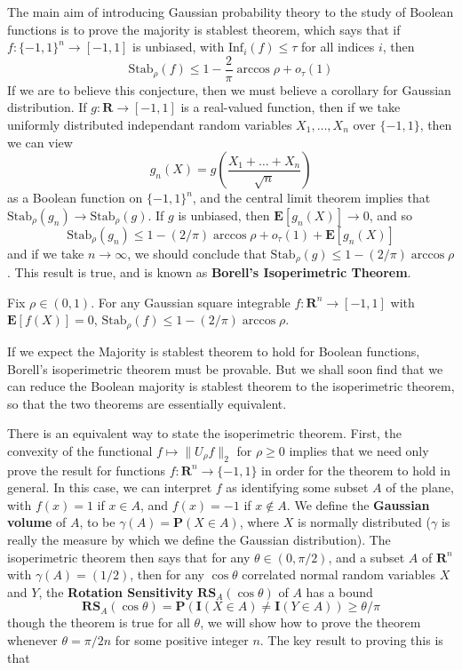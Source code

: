 The main aim of introducing Gaussian probability theory to the study of Boolean functions is to prove the majority is stablest theorem, which says that if $f: \{ -1, 1 \}^n \to [-1,1]$ is unbiased, with $\text{Inf}_i(f) \leq \tau$ for all indices $i$, then
%
\[ \text{Stab}_\rho(f) \leq 1 - \frac{2}{\pi} \arccos \rho + o_\tau(1) \]
%
If we are to believe this conjecture, then we must believe a corollary for Gaussian distribution. If $g: \mathbf{R} \to [-1,1]$ is a real-valued function, then if we take uniformly distributed independant random variables $X_1, \dots, X_n$ over $\{ -1, 1 \}$, then we can view
%
\[ g_n(X) = g \left( \frac{X_1 + \dots + X_n}{\sqrt{n}} \right) \]
%
as a Boolean function on $\{ -1, 1 \}^n$, and the central limit theorem implies that $\text{Stab}_\rho(g_n) \to \text{Stab}_\rho(g)$. If $g$ is unbiased, then $\mathbf{E}[g_n(X)] \to 0$, and so
%
\[ \text{Stab}_\rho(g_n) \leq 1 - (2/\pi) \arccos \rho + o_\tau(1) + \mathbf{E}[g_n(X)] \]
%
and if we take $n \to \infty$, we should conclude that $\text{Stab}_\rho(g) \leq 1 - (2/\pi) \arccos \rho$. This result is true, and is known as {\bf Borell's Isoperimetric Theorem}.

\begin{theorem}
    Fix $\rho \in (0,1)$. For any Gaussian square integrable $f: \mathbf{R}^n \to [-1,1]$ with $\mathbf{E}[f(X)] = 0$, $\text{Stab}_\rho(f) \leq 1 - (2/\pi) \arccos \rho$.
\end{theorem}

If we expect the Majority is stablest theorem to hold for Boolean functions, Borell's isoperimetric theorem must be provable. But we shall soon find that we can reduce the Boolean majority is stablest theorem to the isoperimetric theorem, so that the two theorems are essentially equivalent.

There is an equivalent way to state the isoperimetric theorem. First, the convexity of the functional $f \mapsto \| U_\rho f \|_2$ for $\rho \geq 0$ implies that we need only prove the result for functions $f: \mathbf{R}^n \to \{ -1, 1 \}$ in order for the theorem to hold in general. In this case, we can interpret $f$ as identifying some subset $A$ of the plane, with $f(x) = 1$ if $x \in A$, and $f(x) = -1$ if $x \not \in A$. We define the {\bf Gaussian volume} of $A$, to be $\gamma(A) = \mathbf{P}(X \in A)$, where $X$ is normally distributed ($\gamma$ is really the measure by which we define the Gaussian distribution). The isoperimetric theorem then says that for any $\theta \in (0,\pi/2)$, and a subset $A$ of $\mathbf{R}^n$ with $\gamma(A) = (1/2)$, then for any $\cos \theta$ correlated normal random variables $X$ and $Y$, the {\bf Rotation Sensitivity} $\mathbf{RS}_A(\cos \theta)$ of $A$ has a bound
%
\[ \mathbf{RS}_A(\cos \theta) = \mathbf{P}(\mathbf{I}(X \in A) \neq \mathbf{I}(Y \in A)) \geq \theta / \pi \]
%
though the theorem is true for all $\theta$, we will show how to prove the theorem whenever $\theta = \pi/2n$ for some positive integer $n$. The key result to proving this is that

